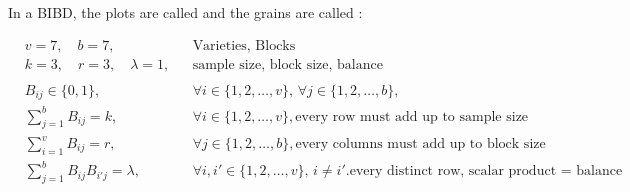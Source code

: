 \documentclass{cons-beamer}
\newcommand{\Variety}{grain}           \newcommand{\Block}{\textnormal{plot}}
\begin{document}
\begin{frame}
  In a BIBD, the plots are called  and the \Variety s are called :

  \begin{example}
    \footnotesize
    \vspace{-1em}
    \begin{align}
      &v = 7, \quad b = 7, &&\mbox{Varieties, Blocks}\\
      &k = 3, \quad r = 3, \quad \lambda = 1, &&\mbox{sample size, block size, balance}\\
      \\
      &B_{ij} \in \{0, 1\}, \quad &&\forall i \in \{1, 2, \dots, v\}, \, \forall j \in \{1, 2, \dots, b\}, \\
      &\sum_{j=1}^b B_{ij} = k, \quad &&\forall i \in \{1, 2, \dots, v\}, \mbox{every row must add up to sample size}\\
      &\sum_{i=1}^v B_{ij} = r, \quad &&\forall j \in \{1, 2, \dots, b\}, \mbox{every columns must add up to block size}\\
      &\sum_{j=1}^b B_{ij} B_{i'j} = \lambda, \quad &&\forall i, i' \in \{1, 2, \dots, v\}, \, i \neq i'. \mbox{every distinct row, scalar product = balance}
    \end{align}
  \end{example}  
\end{frame}
\end{document}
